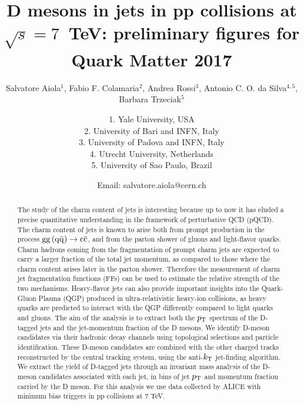 \documentclass[ALICE,manyauthors]{ALICE_analysis_notes}
\begin{document}
%
%
%
\begin{titlepage}
%
\PHdate{\today}
%
\title{D mesons in jets in pp collisions at $\sqrt{s}=7$~TeV: preliminary figures for Quark Matter 2017}
%
\author{Salvatore Aiola$^{1}$, Fabio F. Colamaria$^{2}$, Andrea Rossi$^{3}$, Antonio C. O. da Silva$^{4,5}$, Barbara Trzeciak$^{5}$}
\author{
1. Yale University, USA\\
2. University of Bari and INFN, Italy\\
3. University of Padova and INFN, Italy\\
4. Utrecht University, Netherlands\\
5. University of Sao Paulo, Brazil\\
}
\author{Email: salvatore.aiola@cern.ch}
%
%
\begin{abstract}
The study of the charm content of jets is interesting because up to now
it has eluded a precise quantitative understanding in the framework of perturbative QCD (pQCD).
The charm content of jets is known to arise both from prompt production in the process ${\rm gg\, (q\bar{q})} \rightarrow {\rm c\bar{c}}$, and
from the parton shower of gluons and light-flavor quarks.
Charm hadrons coming from the fragmentation of prompt charm jets 
are expected to carry a larger fraction of the total jet momentum,
as compared to those where the charm content arises later in the
parton shower. Therefore the measurement of charm jet fragmentation functions (FFs) 
can be used to estimate the relative strength of the two mechanisms.
Heavy-flavor jets can also provide important insights into the Quark-Gluon Plasma (QGP)
produced in ultra-relativistic heavy-ion collisions, as heavy quarks are predicted
to interact with the QGP differently compared to light quarks and gluons. 
The aim of the analysis is to extract both the $p_{\rm T}$ spectrum of the D-tagged jets and the jet-momentum fraction of the D mesons. 
We identify D-meson candidates via their hadronic decay channels using topological selections and particle identification.
These D-meson candidates are combined with the other charged tracks reconstructed by the central tracking system, 
using the anti-$k_{\rm T}$ jet-finding algorithm.
We extract the yield of D-tagged jets through an invariant mass analysis of the D-meson candidates associated with each jet, 
in bins of jet $p_{\rm T}$ and momentum fraction carried by the D meson. 
For this analysis we use data collected
by ALICE with minimum bias triggers in pp collisions at 7 TeV.
\end{abstract}
\end{titlepage}
%
\tableofcontents
\newpage
\end{document}
